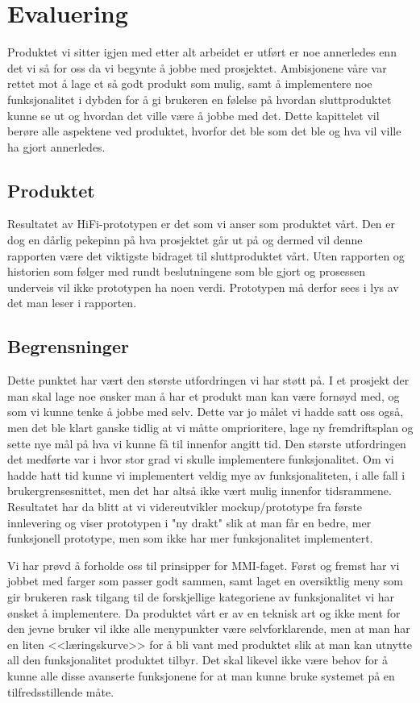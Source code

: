 \chapter{Evaluering}
\lettrine[lines=2]{P}{}roduktet vi sitter igjen med etter alt arbeidet er utført er noe annerledes enn det vi så for oss da vi begynte å jobbe med prosjektet. Ambisjonene våre var rettet mot å lage et så godt produkt som mulig, samt å implementere noe funksjonalitet i dybden for å gi brukeren en følelse på hvordan sluttproduktet kunne se ut og hvordan det ville være å jobbe med det. Dette kapittelet vil berøre alle aspektene ved produktet, hvorfor det ble som det ble og hva vil ville ha gjort annerledes.

\section{Produktet}
Resultatet av HiFi-prototypen er det som vi anser som produktet vårt. Den er dog en dårlig pekepinn på hva prosjektet går ut på og dermed vil denne rapporten være det viktigste bidraget til sluttproduktet vårt. Uten rapporten og historien som følger med rundt beslutningene som ble gjort og prosessen underveis vil ikke prototypen ha noen verdi. Prototypen må derfor sees i lys av det man leser i rapporten.


\section{Begrensninger} \label{sec:begrensninger}
Dette punktet har vært den største utfordringen vi har støtt på. I et prosjekt der man skal lage noe ønsker man å har et produkt man kan være fornøyd med, og som vi kunne tenke å jobbe med selv. Dette var jo målet vi hadde satt oss også, men det ble klart ganske tidlig at vi måtte omprioritere, lage ny fremdriftsplan og sette nye mål på hva vi kunne få til innenfor angitt tid.
Den største utfordringen det medførte var i hvor stor grad vi skulle implementere funksjonalitet. Om vi hadde hatt tid kunne vi implementert veldig mye av funksjonaliteten, i alle fall i brukergrensesnittet, men det har altså ikke vært mulig innenfor tidsrammene.
Resultatet har da blitt at vi videreutvikler mockup/prototype fra første innlevering og viser prototypen i "ny drakt" slik at man får en bedre, mer funksjonell prototype, men som ikke har mer funksjonalitet implementert.

Vi har prøvd å forholde oss til prinsipper for MMI-faget. Først og fremst har vi jobbet med farger som passer godt sammen, samt laget en oversiktlig meny som gir brukeren rask tilgang til de forskjellige kategoriene av funksjonalitet vi har ønsket å implementere.
Da produktet vårt er av en teknisk art og ikke ment for den jevne bruker vil ikke alle menypunkter være selvforklarende, men at man har en liten <<læringskurve>> for å bli vant med produktet slik at man kan utnytte all den funksjonalitet produktet tilbyr.
Det skal likevel ikke være behov for å kunne alle disse avanserte funksjonene for at man kunne bruke systemet på en tilfredsstillende måte.


